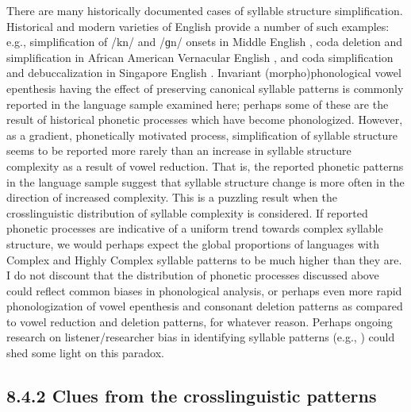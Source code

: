  There are many historically documented cases of syllable structure simplification. Historical and modern varieties of English provide a number of such examples: e.g., simplification of /kn/ and /ɡn/ onsets in Middle English \citep{Minkova2003}, coda deletion and simplification in African American Vernacular English \citep{Rickford1999}, and coda simplification and debuccalization in Singapore English \citep{Deterding2007}. Invariant (morpho)phonological vowel epenthesis having the effect of preserving canonical syllable patterns is commonly reported in the language sample examined here; perhaps some of these are the result of historical phonetic processes which have become phonologized. However, as a gradient, phonetically motivated process, simplification of syllable structure seems to be reported more rarely than an increase in syllable structure complexity as a result of vowel reduction. That is, the reported phonetic patterns in the language sample suggest that syllable structure change is more often in the direction of increased complexity. This is a puzzling result when the crosslinguistic distribution of syllable complexity is considered. If reported phonetic processes are indicative of a uniform trend towards complex syllable structure, we would perhaps expect the global proportions of languages with Complex and Highly Complex syllable patterns to be much higher than they are. I do not discount that the distribution of phonetic processes discussed above could reflect common biases in phonological analysis, or perhaps even more rapid phonologization of vowel epenthesis and consonant deletion patterns as compared to vowel reduction and deletion patterns, for whatever reason. Perhaps ongoing research on listener/researcher bias in identifying syllable patterns (e.g., \citealt{KwonEtAl2017}) could shed some light on this paradox.


\subsection{8.4.2 Clues from the crosslinguistic patterns}

